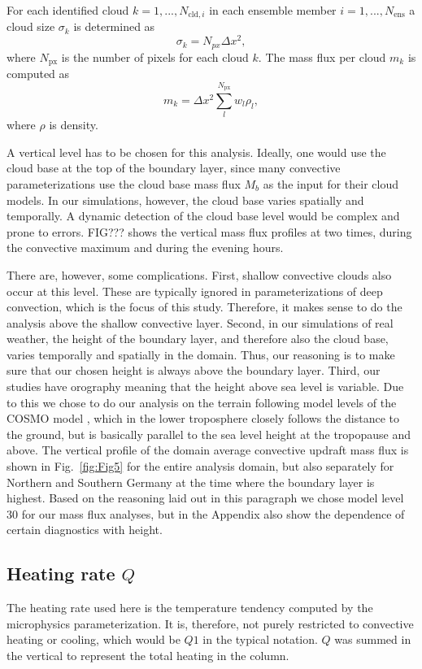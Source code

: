 \documentclass[a4paper, 12pt]{article}
\begin{document}
For each identified cloud $k=1,...,N_{\mathrm{cld},i}$ in each ensemble member $i=1,...,N_{\mathrm{ens}}$ a cloud size $\sigma_k$ is determined as
\begin{equation} \label{eq:cld_size}
 \sigma_k = N_{px} \Delta x^2,
\end{equation}
where $N_{\mathrm{px}}$ is the number of pixels for each cloud $k$. The mass flux per cloud $m_k$ is computed as
\begin{equation} \label{eq:mass_flux_per_cloud}
 m_k = \Delta x^2 \sum_{l}^{N_{\mathrm{px}}} w_l \rho_l,
\end{equation}
where $\rho$ is density.

A vertical level has to be chosen for this analysis. Ideally, one would use the cloud base at the top of the boundary layer, since many convective parameterizations use the cloud base mass flux $M_b$ as the input for their cloud models. In our simulations, however, the cloud base varies spatially and temporally. A dynamic detection of the cloud base level would be complex and prone to errors. FIG??? shows the vertical mass flux profiles at two times, during the convective maximum and during the evening hours. 

There are, however, some complications. First, shallow convective clouds also occur at this level. These are typically ignored in parameterizations of deep convection, which is the focus of this study. Therefore, it makes sense to do the analysis above the shallow convective layer. Second, in our simulations of real weather, the height of the boundary layer, and therefore also the cloud base, varies temporally and spatially in the domain. Thus, our reasoning is to make sure that our chosen height is always above the boundary layer. Third, our studies have orography meaning that the height above sea level is variable. Due to this we chose to do our analysis on the terrain following model levels of the COSMO model \citep{???}, which in the lower troposphere closely follows the distance to the ground, but is basically parallel to the sea level height at the tropopause and above. The vertical profile of the domain average convective updraft mass flux is shown in Fig.~\ref{fig:Fig5} for the entire analysis domain, but also separately for Northern and Southern Germany at the time where the boundary layer is highest. Based on the reasoning laid out in this paragraph we chose model level 30 for our mass flux analyses, but in the Appendix also show the dependence of certain diagnostics with height.

\subsection{Heating rate $Q$}
The heating rate used here is the temperature tendency computed by the microphysics parameterization. It is, therefore, not purely restricted to convective heating or cooling, which would be $Q1$ in the typical notation. $Q$ was summed in the vertical to represent the total heating in the column.
\end{document}
